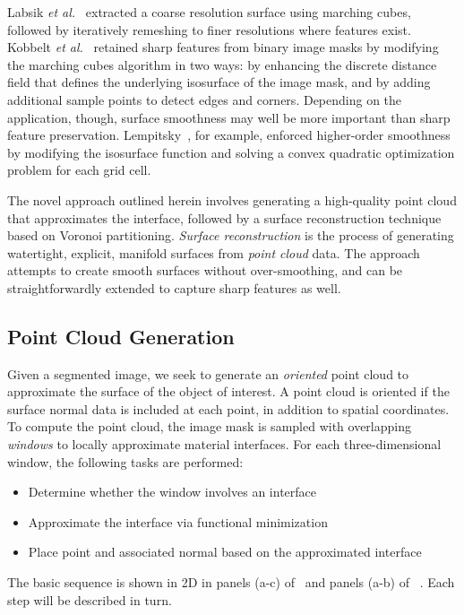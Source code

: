 Labsik \textit{et al.}~\cite{labsik_2002} extracted a coarse resolution surface using marching cubes, followed by iteratively remeshing to finer resolutions where features exist. Kobbelt \textit{et al.}~\cite{kobbelt_2001} retained sharp features from binary image masks by modifying the marching cubes algorithm in two ways: by enhancing the discrete distance field that defines the underlying isosurface of the image mask, and by adding additional sample points to detect edges and corners. Depending on the application, though, surface smoothness may well be more important than sharp feature preservation. Lempitsky~\cite{lempitsky_2010}, for example, enforced higher-order smoothness by modifying the isosurface function and solving a convex quadratic optimization problem for each grid cell.

The novel approach outlined herein involves generating a high-quality point cloud that approximates the interface, followed by a  surface reconstruction technique based on Voronoi partitioning. \textit{Surface reconstruction} is the process of generating watertight, explicit, manifold surfaces from \textit{point cloud} data. The approach attempts to create smooth surfaces without over-smoothing, and can be straightforwardly extended to capture sharp features as well.

\subsection{Point Cloud Generation}
\label{Point Cloud Generation}

Given a segmented image, we seek to generate an \textit{oriented} point cloud to approximate the surface of the object of interest. A point cloud is oriented if the surface normal data is included at each point, in addition to spatial coordinates. To compute the point cloud, the image mask is sampled with overlapping \textit{windows} to locally approximate material interfaces. For each three-dimensional window, the following tasks are performed:
\begin{itemize}[noitemsep]
  \item Determine whether the window involves an interface
  \item Approximate the interface via functional minimization
  \item Place point and associated normal based on the approximated interface
\end{itemize}
The basic sequence is shown in 2D in panels (a-c) of~ and panels (a-b) of ~. Each step will be described in turn.

